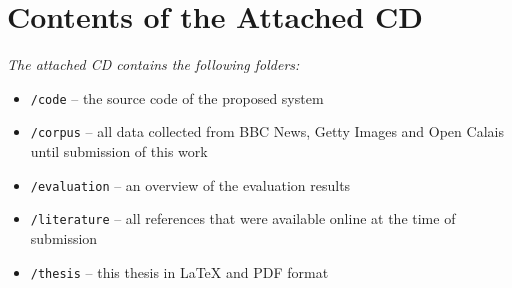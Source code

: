 \documentclass[11pt,a4paper,twoside]{article}
\begin{document}

\cleardoublepage
\fancyhead[LE,RO,LO,RE]{} %
\section*{Contents of the Attached CD}

\emph{The attached CD contains the following folders:}

\begin{itemize}
    \item \lstinline{/code} -- the source code of the proposed system
    \item \lstinline{/corpus} -- all data collected from BBC News, Getty Images and Open Calais until submission of this work
    \item \lstinline{/evaluation} -- an overview of the evaluation results
    \item \lstinline{/literature} -- all references that were available online at the time of submission
    \item \lstinline{/thesis} -- this thesis in LaTeX and PDF format
\end{itemize}


\cleardoublepage








\end{document}
